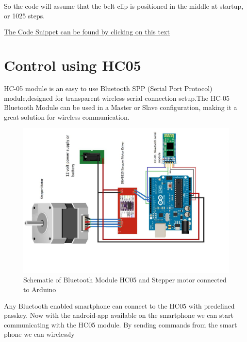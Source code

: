 \documentclass[MTech]{iitmdiss}
\begin{document}
So the code will assume that the belt clip is positioned in the middle at startup, or 1025 steps.

\hyperref[sec:code1]{The Code Snippet can be found by clicking on this text}


\section{Control using HC05}

HC-05 module is an easy to use Bluetooth SPP (Serial Port Protocol) module,designed for transparent wireless serial connection setup.The HC-05 Bluetooth Module can be used in a Master or Slave configuration, making it a great solution for wireless communication.

	\begin{figure}[h]
		\includegraphics[width=\linewidth]{ffigures/hcardstp}
		\centering
		\caption{Schematic of Bluetooth Module HC05 and Stepper motor connected to Arduino}
		\label{fig:hcardstp}
	
	\end{figure}
	
\pagebreak

\noindent Any Bluetooth enabled smartphone can connect to the HC05 with predefined passkey. Now with the android-app available on the smartphone we can start communicating with the HC05 module. By sending commands from the smart phone we can wirelessly 
\end{document}
